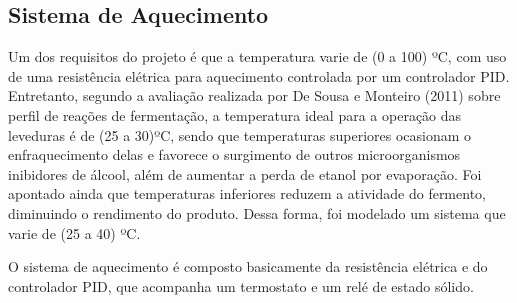 \subsection{Sistema de Aquecimento}

Um dos requisitos do projeto é que a temperatura varie de (0 a 100) ºC, com uso de uma resistência elétrica para aquecimento controlada por um controlador PID. Entretanto, segundo a avaliação realizada por De Sousa e Monteiro (2011) sobre perfil de reações de fermentação, a temperatura ideal para a operação das leveduras é de (25 a 30)ºC, sendo que temperaturas superiores ocasionam o enfraquecimento delas e favorece o surgimento de outros microorganismos inibidores de álcool, além de aumentar a perda de etanol por evaporação. Foi apontado ainda que temperaturas inferiores reduzem a atividade do fermento, diminuindo o rendimento do produto. Dessa forma,  foi modelado um sistema que varie de (25 a 40) ºC.

O sistema de aquecimento é composto basicamente da resistência elétrica e do controlador PID, que acompanha um termostato e um relé de estado sólido.

